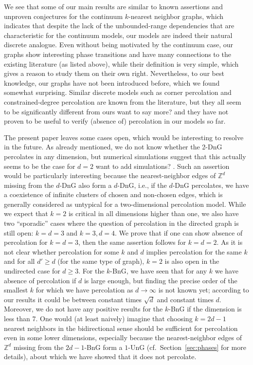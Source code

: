 \documentclass{article}
\theoremstyle{definition}
\newcommand{\1}{\mathbbm{1}}
\newcommand{\0}{\mathbf{o}}
\newcommand{\Z}{\mathbb{Z}}
\begin{document}
We see that some of our main results are similar to known assertions and unproven conjectures for the continuum $k$-nearest neighbor graphs, which indicates that despite the lack of the unbounded-range dependencies that are characteristic for the continuum models, our models are indeed their natural discrete analogue. Even without being motivated by the continuum case, our graphs show interesting phase transitions and have many connections to the existing literature (as listed above), while their definition is very simple, which gives a reason to study them on their own right. Nevertheless, to our best knowledge, our graphs have not been introduced before, which we found somewhat surprising. Similar discrete models such as corner percolation \cite{cornerperc} and constrained-degree percolation \cite{constraineddegreeperc} are known from the literature, but they all seem to be significantly different from ours \color{red} want to say more? \color{black} and they have not proven to be useful to verify (absence of) percolation in our models so far.

The present paper leaves some cases open, which would be interesting to resolve in the future. As already mentioned, we do not know whether the 2-DnG percolates in any dimension, but numerical simulations suggest that this actually seems to be the case for $d=2$ \color{red} want to add simulations? \color{black}. Such an assertion would be particularly interesting because the nearest-neighbor edges of $\Z^d$ missing from the $d$-DnG also form a $d$-DnG, i.e., if the $d$-DnG percolates, we have a coexistence of infinite clusters of chosen and non-chosen edges, which is generally considered as untypical for a two-dimensional percolation model. While we expect that $k=2$ is critical in all dimensions higher than one, we also have two ``sporadic'' cases where the question of percolation in the directed graph is still open: $k=d=3$ and $k=3,d=4$. We prove that if one can show absence of percolation for $k=d=3$, then the same assertion follows for $k=d=2$. As it is not clear whether percolation for some $k$ and $d$ implies percolation for the same $k$ and for all $d' \geq d$ (for the same type of graph), $k=2$ is also open in the undirected case for $d \geq 3$. For the $k$-BnG, we have seen that for any $k$ we have absence of percolation if $d$ is large enough, but finding the precise order of the smallest $k$ for which we have percolation as $d \to \infty$ is not known yet; according to our results it could be between constant times $\sqrt d$ and constant times $d$. Moreover, we do not have any positive results for the $k$-BnG if the dimension is less than 7. One would (at least naively) imagine that choosing $k=2d-1$ nearest neighbors in the bidirectional sense should be sufficient for percolation even in some lower dimensions, especially because the nearest-neighbor edges of $\Z^d$ missing from the $2d-1$-BnG form a $1$-UnG (cf.~Section~\ref{sec:phases} for more details), about which we have showed that it does not percolate.
\end{document}
